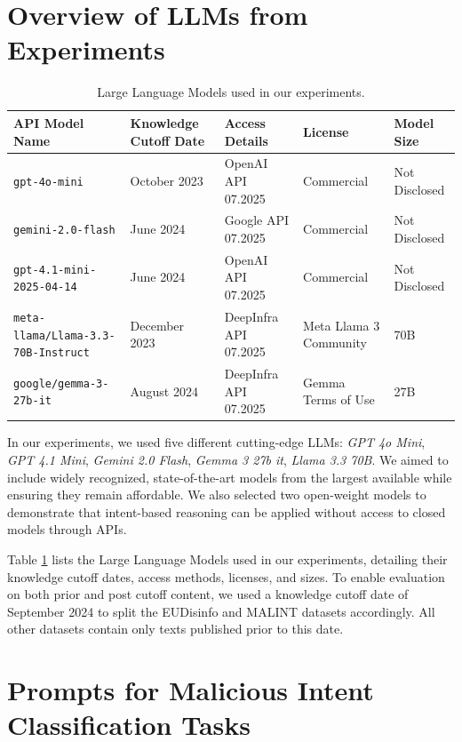 \documentclass[11pt]{article}
\begin{document}
\section{Overview of LLMs from Experiments}
\label{appendix:llms_details}


\begin{table}[ht!]
\scriptsize
\centering
\begin{tabular}{lllll}
\toprule
 \textbf{API Model Name} & \textbf{Knowledge Cutoff Date} & \textbf{Access Details} & \textbf{License} & \textbf{Model Size}\\\midrule
 \texttt{gpt-4o-mini} &October 2023 & OpenAI API 07.2025 & Commercial & Not Disclosed\\
 \texttt{gemini-2.0-flash} & June 2024 & Google API 07.2025 & Commercial & Not Disclosed\\ 
 \texttt{gpt-4.1-mini-2025-04-14} & June 2024 & OpenAI API 07.2025 & Commercial & Not Disclosed\\ 
 \texttt{meta-llama/Llama-3.3-70B-Instruct} &  December 2023 & DeepInfra API 07.2025 & Meta Llama 3 Community & 70B \\ 
 \texttt{google/gemma-3-27b-it} & August 2024 & DeepInfra API 07.2025 & Gemma Terms of Use & 27B \\ 
\bottomrule
\end{tabular}
\caption{Large Language Models used in our experiments.}
\label{tab:llm-models}
\end{table}


In our experiments, we used five different cutting-edge LLMs: \textit{GPT 4o Mini},
\textit{GPT 4.1 Mini}, \textit{Gemini 2.0 Flash}, \textit{Gemma 3 27b it}, \textit{Llama 3.3 70B}. We aimed to include widely recognized, state-of-the-art models from the largest available while ensuring they remain affordable. We also selected two open-weight models to demonstrate that intent-based reasoning can be applied without access to closed models through APIs. 
 
 Table \ref{tab:llm-models} lists the Large Language Models used in our experiments, detailing their knowledge cutoff dates, access methods, licenses, and sizes. To enable evaluation on both prior and post cutoff content, we used a knowledge cutoff date of September 2024 to split the EUDisinfo and MALINT datasets accordingly. All other datasets contain only texts published prior to this date.


\section{Prompts for Malicious Intent Classification Tasks}
\label{appendix:prompts_malint}
\end{document}
